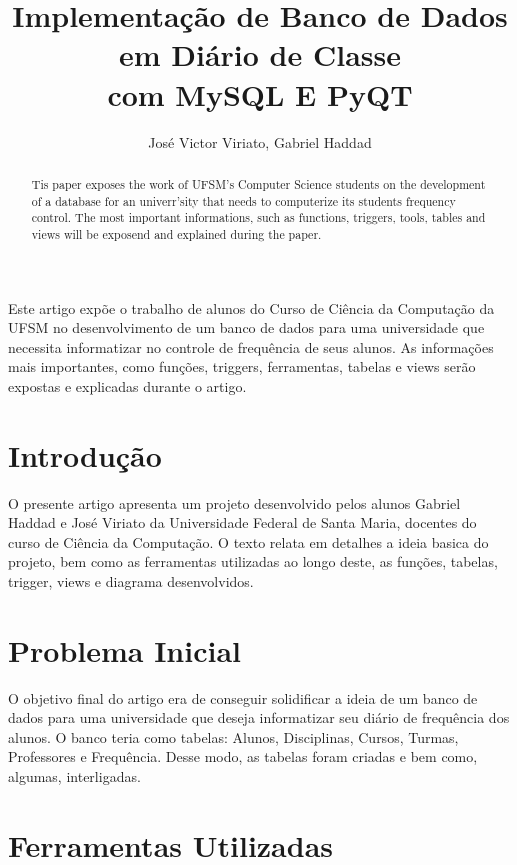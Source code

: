 \documentclass[12pt]{article}
\title{Implementação de Banco de Dados em Diário de Classe\\ com MySQL E PyQT}
\author{José Victor Viriato, Gabriel Haddad }
\begin{document}
 

\maketitle

\begin{abstract}
  Tis paper exposes the work of UFSM's Computer Science students on the development of a database for an univerr'sity that needs to computerize its students frequency control. The most important informations, such as functions, triggers, tools, tables and views will be exposend and explained during the paper.
\end{abstract}
     
\begin{resumo} 
  Este artigo expõe o trabalho de alunos do Curso de Ciência da Computação da UFSM no desenvolvimento de um banco de dados para uma universidade que necessita informatizar no controle de frequência de seus alunos. As informações mais importantes, como funções, triggers, ferramentas, tabelas e views serão expostas e explicadas durante o artigo.
\end{resumo}


\section{Introdução}

O presente artigo apresenta um projeto desenvolvido pelos alunos Gabriel Haddad e José Viriato da Universidade Federal de Santa Maria, docentes do curso de Ciência da Computação. O texto relata em detalhes a ideia basica do projeto, bem como as ferramentas utilizadas ao longo deste, as funções, tabelas, trigger, views e diagrama desenvolvidos. 


\section{Problema Inicial} \label{sec:probinic}


O objetivo final do artigo era de conseguir solidificar a ideia de um banco de dados para uma universidade que deseja informatizar seu diário de frequência dos alunos. O banco teria como tabelas: Alunos, Disciplinas, Cursos, Turmas, Professores e Frequência. Desse modo, as tabelas foram criadas e bem como, algumas, interligadas.



\section{Ferramentas Utilizadas}\label{sec:ferrusd}
\end{document}
